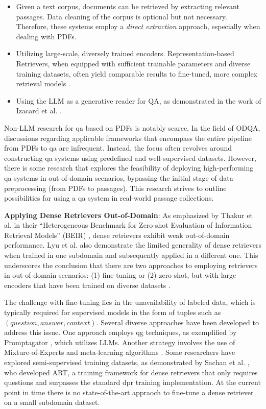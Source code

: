 \begin{itemize}
    \item Given a text corpus, documents can be retrieved by extracting relevant passages. Data cleaning of the corpus is optional but not necessary. Therefore, these systems employ a \textit{direct extraction} approach, especially when dealing with PDFs.
    \item Utilizing large-scale, diversely trained encoders. Representation-based Retrievers, when equipped with sufficient trainable parameters and diverse training datasets, often yield comparable results to fine-tuned, more complex retrieval models \cite{ni_large_2021,neelakantan_text_2022}.
    \item Using the LLM as a generative reader for QA, as demonstrated in the work of Izacard et al. \cite{izacard_leveraging_2021}.
\end{itemize}

Non-LLM research for \gls{qa} based on PDFs is notably scarce. In the field of ODQA, discussions regarding applicable frameworks that encompass the entire pipeline from PDFs to \gls{qa} are infrequent. Instead, the focus often revolves around constructing \gls{qa} systems using predefined and well-supervised datasets. However, there is some research that explores the feasibility of deploying high-performing \gls{qa} systems in out-of-domain scenarios, bypassing the initial stage of data preprocessing (from PDFs to passages). This research strives to outline possibilities for using a \gls{qa} system in real-world passage collections.

\noindent \textbf{Applying Dense Retrievers Out-of-Domain}: As emphasized by Thakur et al. in their \enquote{Heterogeneous Benchmark for Zero-shot Evaluation of Information Retrieval Models} (BEIR) \cite{thakur_beir_2021}, dense retrievers exhibit weak out-of-domain performance. Lyu et al. \cite{farea_evaluation_2022} also demonstrate the limited generality of dense retrievers when trained in one subdomain and subsequently applied in a different one. This underscores the conclusion that there are two approaches to employing retrievers in out-of-domain scenarios: (1) fine-tuning or (2) zero-shot, but with large encoders that have been trained on diverse datasets \cite{ni_large_2021}.

The challenge with fine-tuning lies in the unavailability of labeled data, which is typically required for supervised models in the form of tuples such as $(question, answer, context)$. Several diverse approaches have been developed to address this issue. One approach employs \gls{qg} techniques, as exemplified by Promptagator \cite{dai_promptagator_2022}, which utilizes LLMs. Another strategy involves the use of Mixture-of-Experts and meta-learning algorithms \cite{chen_improving_2021}. Some researchers have explored semi-supervised training datasets, as demonstrated by Sachan et al. \cite{sachan_questions_2023}, who developed ART, a training framework for dense retrievers that only requires questions and surpasses the standard \gls{dpr} training implementation. At the current point in time there is no state-of-the-art appraoch to fine-tune a dense retriever on a small subdomain dataset.

